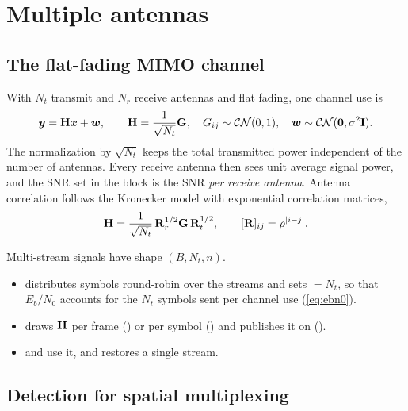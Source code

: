 \chapter{Multiple antennas}\label{ch:mimo}

\section{The flat-fading MIMO channel}
With $N_t$ transmit and $N_r$ receive antennas and flat fading, one channel use is
\begin{equation}
  \bm{y}=\mathbf{H}\bm{x}+\bm{w},\qquad \mathbf{H}=\frac{1}{\sqrt{N_t}}\mathbf{G},\quad G_{ij}\sim\mathcal{CN}(0,1),\quad \bm{w}\sim\mathcal{CN}(\bm{0},\sigma^2\mathbf{I}).
\end{equation}
The normalization by $\sqrt{N_t}$ keeps the total transmitted power independent of the number of
antennas. Every receive antenna then sees unit average signal power, and the SNR set in the
 block is the SNR \emph{per receive antenna}. Antenna correlation follows the
Kronecker model with exponential correlation matrices,
\begin{equation}
  \mathbf{H}=\frac{1}{\sqrt{N_t}}\,\mathbf{R}_r^{1/2}\mathbf{G}\,\mathbf{R}_t^{1/2},\qquad [\mathbf{R}]_{ij}=\rho^{|i-j|}.
\end{equation}

\begin{incode}
Multi-stream signals have shape $(B,N_t,n)$.
\begin{itemize}
  \item {} distributes symbols round-robin over the streams and sets
  $=N_t$, so that $E_b/N_0$ accounts for the $N_t$ symbols sent per channel
  use (\cref{eq:ebn0}).
  \item {} draws $\mathbf{H}$ per frame () or per symbol () and
  publishes it on  ().
  \item {} and  use it, and  restores a
  single stream.
\end{itemize}
\end{incode}

\section{Detection for spatial multiplexing}
